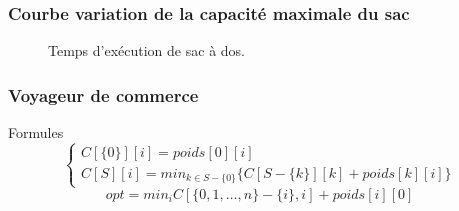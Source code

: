 \documentclass[french]{beamer}
\begin{document}
  \begin{frame}
    \frametitle{Courbe variation de la capacité maximale du sac}
\begin{figure}[h!]
\centering
{}
\caption{Temps d'exécution de sac à dos.}
\end{figure}
  \end{frame}

  \begin{frame}
    \frametitle{Voyageur de commerce}
    \begin{alertblock}{Formules}
      \begin{equation}
        \begin{cases}
          C[\{0\}][i] = poids[0][i] \\
          C[S][i] = min_{k \in S - \{ 0 \}} \{ C[S- \{ k \}][k] + poids[k][i]  \}
        \end{cases} 
      \end{equation}
      \begin{equation}
      	opt = min_{i}C[\{0, 1, \dots, n\} - \{ i\}, i] + poids[i][0]
      \end{equation}
    \end{alertblock}
  \end{frame}
\end{document}
